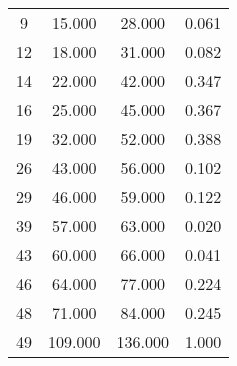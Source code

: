 % 
\begin{tabular}{cccc}
  \hline
  \hline
9 & 15.000 & 28.000 & 0.061 \\ 
  12 & 18.000 & 31.000 & 0.082 \\ 
  14 & 22.000 & 42.000 & 0.347 \\ 
  16 & 25.000 & 45.000 & 0.367 \\ 
  19 & 32.000 & 52.000 & 0.388 \\ 
  26 & 43.000 & 56.000 & 0.102 \\ 
  29 & 46.000 & 59.000 & 0.122 \\ 
  39 & 57.000 & 63.000 & 0.020 \\ 
  43 & 60.000 & 66.000 & 0.041 \\ 
  46 & 64.000 & 77.000 & 0.224 \\ 
  48 & 71.000 & 84.000 & 0.245 \\ 
  49 & 109.000 & 136.000 & 1.000 \\ 
   \hline
\end{tabular}
